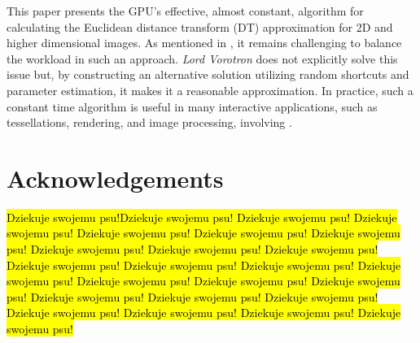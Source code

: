 \documentclass[format=acmsmall,screen,review,authordraft,nonacm]{acmart}
\newcommand{\ourjfa}{Lord Vorotron} %
\begin{document}
This paper presents the GPU's effective, almost constant, algorithm for calculating the Euclidean distance transform (DT) approximation for 2D and higher dimensional images.
%
As mentioned in \cite{cao2010parallel}, it remains challenging to balance the workload in such an approach.
%
\textit{\ourjfa} does not explicitly solve this issue but, by constructing an alternative solution utilizing random shortcuts and parameter estimation, it makes it a reasonable approximation.
%
In practice, such a constant time algorithm is useful in many interactive applications, such as tessellations, rendering, and image processing, involving \cite{rong2006jump}.

\section{Acknowledgements} %

\hl{Dziekuje swojemu psu!Dziekuje swojemu psu! Dziekuje swojemu psu! Dziekuje swojemu psu! Dziekuje swojemu psu! Dziekuje swojemu psu! Dziekuje swojemu psu! Dziekuje swojemu psu! Dziekuje swojemu psu! Dziekuje swojemu psu! Dziekuje swojemu psu! Dziekuje swojemu psu! Dziekuje swojemu psu! Dziekuje swojemu psu! Dziekuje swojemu psu! Dziekuje swojemu psu! Dziekuje swojemu psu! Dziekuje swojemu psu! Dziekuje swojemu psu! Dziekuje swojemu psu! Dziekuje swojemu psu! Dziekuje swojemu psu! Dziekuje swojemu psu! Dziekuje swojemu psu!  }




\end{document}
